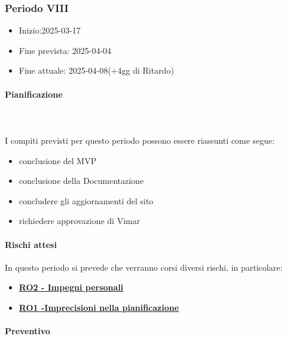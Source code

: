 \subsubsection{Periodo VIII}

\begin{itemize}
    \item Inizio:2025-03-17 
    \item Fine prevista: 2025-04-04
    \item Fine attuale: 2025-04-08(+4gg di Ritardo)
\end{itemize}
\paragraph{Pianificazione} \hspace{1cm}
\\ \hspace{1cm} \\

I compiti previsti per questo periodo possono essere riassunti come segue:  
\begin{itemize}
    \item conclusione del MVP
    \item conclusione della Documentazione
    \item concludere gli aggiornamenti del sito
    \item richiedere approvazione di Vimar
    
\end{itemize}

\paragraph{Rischi attesi}  
In questo periodo si prevede che verranno corsi diversi rischi, in particolare:
\begin{itemize}
    \item \textbf{\hyperlink{RO2}{RO2 - Impegni personali  }}
    \item \textbf{\hyperlink{RO1}{RO1 -Imprecisioni nella pianificazione}}

   
\end{itemize}

\paragraph{Preventivo} \hspace{1cm} 

